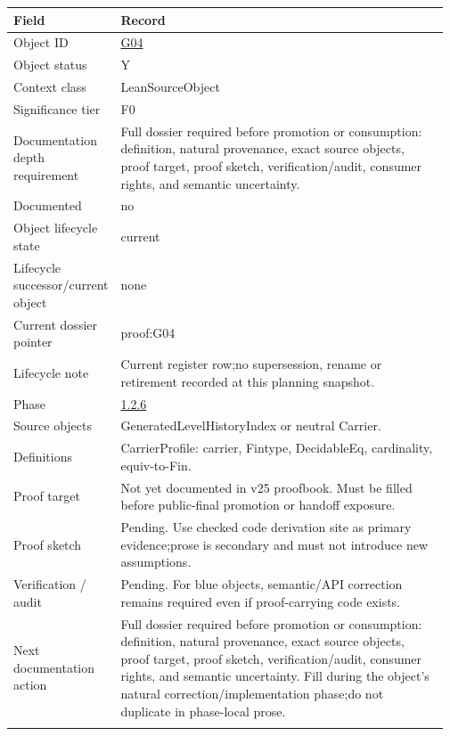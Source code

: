 \begin{longtable}{L{0.16\linewidth} L{0.81\linewidth}}
\hline
\textbf{Field} & \textbf{Record}\\
\hline
Object ID & \hyperlink{object-row-G04}{G04}\\
\hline\addlinespace[0.20em]
Object status & Y\\
\hline\addlinespace[0.20em]
Context class & LeanSourceObject\\
\hline\addlinespace[0.20em]
Significance tier & F0\\
\hline\addlinespace[0.20em]
Documentation depth requirement & Full dossier required before promotion or consumption: definition, natural provenance, exact source objects, proof target, proof sketch, verification/\allowbreak{}audit, consumer rights, and semantic uncertainty.\\
\hline\addlinespace[0.20em]
Documented & no\\
\hline\addlinespace[0.20em]
Object lifecycle state & current\\
\hline\addlinespace[0.20em]
Lifecycle successor/\allowbreak{}current object & none\\
\hline\addlinespace[0.20em]
Current dossier pointer & proof:G04\\
\hline\addlinespace[0.20em]
Lifecycle note & Current register row;\newline no supersession, rename or retirement recorded at this planning snapshot.\\
\hline\addlinespace[0.20em]
Phase & \hyperlink{phase-row-1-2-6}{1.2.6}\\
\hline\addlinespace[0.20em]
Source objects & GeneratedLevelHistoryIndex or neutral Carrier.\\
\hline\addlinespace[0.20em]
Definitions & CarrierProfile: carrier, Fintype, DecidableEq, cardinality, equiv-to-Fin.\\
\hline\addlinespace[0.20em]
Proof target & Not yet documented in v25 proofbook. Must be filled before public-final promotion or handoff exposure.\\
\hline\addlinespace[0.20em]
Proof sketch & Pending. Use checked code derivation site as primary evidence;\newline prose is secondary and must not introduce new assumptions.\\
\hline\addlinespace[0.20em]
Verification /\allowbreak{} audit & Pending. For blue objects, semantic/\allowbreak{}API correction remains required even if proof-carrying code exists.\\
\hline\addlinespace[0.20em]
Next documentation action & Full dossier required before promotion or consumption: definition, natural provenance, exact source objects, proof target, proof sketch, verification/\allowbreak{}audit, consumer rights, and semantic uncertainty. Fill during the object's natural correction/\allowbreak{}implementation phase;\newline do not duplicate in phase-local prose.\\
\hline\addlinespace[0.20em]
\end{longtable}
